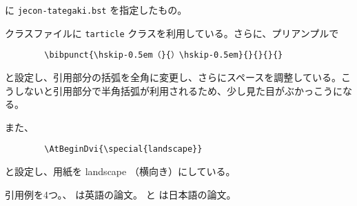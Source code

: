 \documentclass[10pt]{tarticle}
\begin{document}
\verb|| に \verb|jecon-tategaki.bst| を指定したもの。
\vspace*{1em}

クラスファイルに \texttt{tarticle} クラスを利用している。さらに、プリアンプルで
\begin{verbatim}
        \bibpunct{\hskip-0.5em（}{）\hskip-0.5em}{}{}{}{}
\end{verbatim}
と設定し、引用部分の括弧を全角に変更し、さらにスペースを調整している。こ
うしないと引用部分で半角括弧が利用されるため、少し見た目がぶかっこうにな
る。

また、
\begin{verbatim}
        \AtBeginDvi{\special{landscape}}
\end{verbatim}
と設定し、用紙を landscape （横向き）にしている。
\vspace*{2em}

引用例を4つ。\citet{ishikawa03:_green_gas_emiss_contr_open_econom}、
\citet{takeda06:_cge_analy_welfar_effec_trade} は英語の論文。
\citet{oyama99:_mark_stru} と \citet{kuroda97jp:keo} は日本語の論文。

\nocite{*}



%

\end{document}
